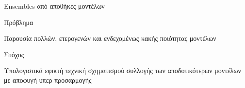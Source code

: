 \documentclass{beamer}
\begin{document}
   \begin{frame}{Ensembles από αποθήκες μοντέλων}
   	\begin{minipage}[t]{.3\textwidth}  		
   		Πρόβλημα
   		\vspace{4ex}
   	\end{minipage}%
   	\begin{minipage}[t]{.6\textwidth}
   		Παρουσία πολλών, ετερογενών και ενδεχομένως κακής ποιότητας μοντέλων 	
   		\vspace{4ex}
   	\end{minipage}
   	\begin{minipage}[t]{.3\textwidth}  		
   		Στόχος
   		\vspace{4ex}
   	\end{minipage}%
   	\begin{minipage}[t]{.6\textwidth}  
   		Υπολογιστικά εφικτή τεχνική σχηματισμού συλλογής των αποδοτικότερων μοντέλων με αποφυγή υπερ-προσαρμογής 		
   		\vspace{4ex} 
   	\end{minipage}
   \end{frame}
\end{document}
